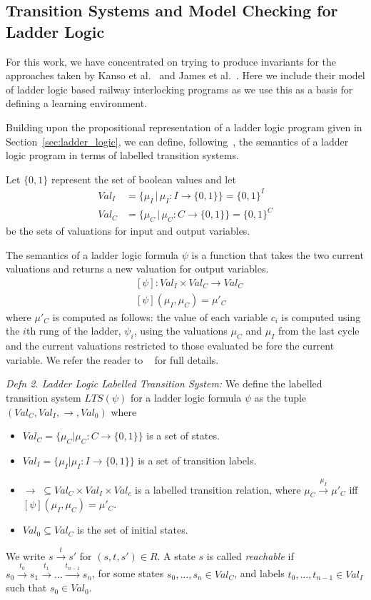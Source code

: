 \documentclass[conference,compsoc]{IEEEtran}
\begin{document}
\subsection{Transition Systems and Model Checking for Ladder Logic}
For this work, we have concentrated on trying to produce invariants for the approaches taken by Kanso et al.~\cite{kanso2009automated} and James et al.~\cite{james2013verification}. Here we include their model of ladder logic based railway interlocking programs as we use this as a basis for defining a learning environment.

Building upon the propositional representation of a ladder logic program given in Section~\ref{sec:ladder_logic}, we can define, following~\cite{sefm14}, the semantics of a ladder logic program in terms of labelled transition systems.

Let $\{0,1\}$ represent the set of boolean values and let
\begin{align*}
 Val_I  &= \{ \mu_I \, | \, \mu_I : I \to \{0 , 1 \} \}  = \{0,1 \}^I   \\
 Val_C &=  \{ \mu_C \, | \, \mu_C : C \to \{ 0 , 1 \} \} = \{ 0,1 \}^C 
\end{align*}
be the sets of valuations for input and output variables.

The semantics of a ladder logic formula $\psi$ is a function that takes the two current valuations and returns a new
valuation for output variables.
\begin{align*}
 & [ \psi ] : Val_I \times Val_C \to  Val_C \\
 & [ \psi ] ( \mu_I, \mu_C ) = \mu'_C 
\end{align*}
where $\mu'_C$ is computed as follows: the value of each variable $c_i$ is computed using the $i$th rung of the ladder, $\psi_i$, using the valuations $\mu_C$ and $\mu_I$ from the last cycle and the current valuations restricted to those evaluated be fore the current variable. We refer the reader to ~\cite{sefm14} for full details.

\textit{Defn 2. Ladder Logic Labelled Transition System:}
We define the labelled transition system $LTS(\psi)$ for a ladder logic formula $\psi$ as the tuple $(Val_C,Val_I,\rightarrow, Val_0)$ where
\begin{itemize}
\item $Val_C = \{ \mu_C | \mu_C : C \to \{ 0 , 1 \} \}$ is a set of states.
\item $Val_I = \{ \mu_I | \mu_I : I \to \{0 , 1 \} \}$ is a set of transition labels.
\item $\rightarrow \; \subseteq Val_C \times Val_I \times Val_c $ is a labelled transition relation, where $\mu_C \xrightarrow{\mu_I} \mu'_C$ iff  $[ \psi ] ( \mu_I , \mu_C) = \mu'_C$.
\item $ Val_0 \subseteq Val_C$ is the set of initial states.

\end{itemize}
%
We write $ s \xrightarrow{t} s'$ for $(s,t,s')\in R$.
A state $s$ is called \emph{reachable} if 
$s_0 \xrightarrow{t_0} s_{1} \xrightarrow{t_1} \ldots 
\xrightarrow{t_{n-1}} s_n$,  
for some states $s_0,\ldots, s_{n} \in Val_C$, and 
labels $t_0, \ldots, t_{n-1} \in Val_I$ such that
$s_0 \in Val_0$.  
\end{document}
